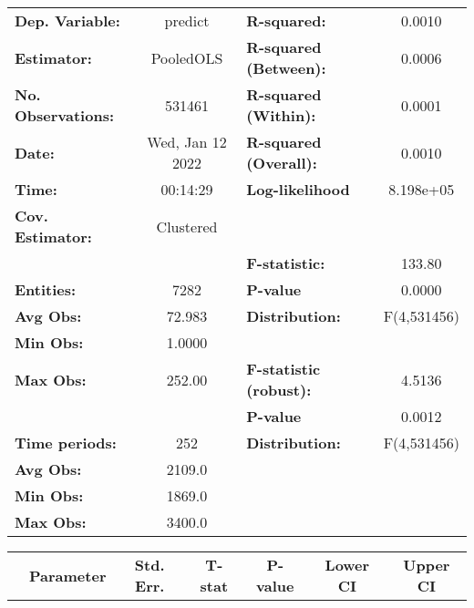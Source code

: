 \begin{center}
\begin{tabular}{lclc}
\toprule
\textbf{Dep. Variable:}    &      predict       & \textbf{  R-squared:         }   &      0.0010      \\
\textbf{Estimator:}        &     PooledOLS      & \textbf{  R-squared (Between):}  &      0.0006      \\
\textbf{No. Observations:} &       531461       & \textbf{  R-squared (Within):}   &      0.0001      \\
\textbf{Date:}             &  Wed, Jan 12 2022  & \textbf{  R-squared (Overall):}  &      0.0010      \\
\textbf{Time:}             &      00:14:29      & \textbf{  Log-likelihood     }   &    8.198e+05     \\
\textbf{Cov. Estimator:}   &     Clustered      & \textbf{                     }   &                  \\
\textbf{}                  &                    & \textbf{  F-statistic:       }   &      133.80      \\
\textbf{Entities:}         &        7282        & \textbf{  P-value            }   &      0.0000      \\
\textbf{Avg Obs:}          &       72.983       & \textbf{  Distribution:      }   &   F(4,531456)    \\
\textbf{Min Obs:}          &       1.0000       & \textbf{                     }   &                  \\
\textbf{Max Obs:}          &       252.00       & \textbf{  F-statistic (robust):} &      4.5136      \\
\textbf{}                  &                    & \textbf{  P-value            }   &      0.0012      \\
\textbf{Time periods:}     &        252         & \textbf{  Distribution:      }   &   F(4,531456)    \\
\textbf{Avg Obs:}          &       2109.0       & \textbf{                     }   &                  \\
\textbf{Min Obs:}          &       1869.0       & \textbf{                     }   &                  \\
\textbf{Max Obs:}          &       3400.0       & \textbf{                     }   &                  \\
\bottomrule
\end{tabular}
\begin{tabular}{lcccccc}
                & \textbf{Parameter} & \textbf{Std. Err.} & \textbf{T-stat} & \textbf{P-value} & \textbf{Lower CI} & \textbf{Upper CI}  \\

\end{tabular}
\end{center}
